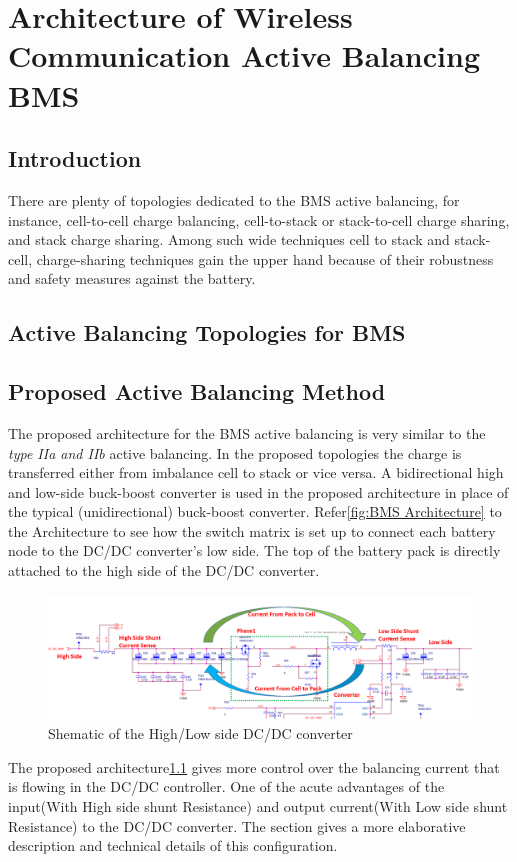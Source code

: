 \chapter{Architecture of Wireless Communication Active Balancing BMS}\label{ch:Architecture_Active_Balancing_BMS}
\section{Introduction}
There are plenty of topologies dedicated to the BMS active balancing, for instance, cell-to-cell charge balancing, cell-to-stack or stack-to-cell charge sharing, and stack charge sharing. Among such wide techniques cell to stack and stack-cell, charge-sharing techniques gain the upper hand because of their robustness and safety measures against the battery.
\section{Active Balancing Topologies for BMS }


\section{Proposed Active Balancing Method}
The proposed architecture for the BMS active balancing is very similar to the \textit{type IIa and IIb} active balancing. In the proposed topologies the charge is transferred either from imbalance cell to stack or vice versa.
A bidirectional high and low-side buck-boost converter is used in the proposed architecture in place of the typical (unidirectional) buck-boost converter. Refer\ref{fig:BMS Architecture} to the Architecture to see how the switch matrix is set up to connect each battery node to the DC/DC converter's low side. The top of the battery pack is directly attached to the high side of the DC/DC converter.
\begin{figure}[h]
	\centering
	\includegraphics[width=1\textwidth]{Chap04/Figures/Low_high_side_Converter_shematic.PNG}
	\caption{Shematic of the High/Low side DC/DC converter } 
	\label{fig:High_Low_DC_DC_Shematic}
\end{figure}
The proposed architecture\ref{fig:High_Low_DC_DC_Shematic} gives more control over the balancing current that is flowing in the DC/DC controller. One of the acute advantages of the input(With High side shunt Resistance) and output current(With Low side shunt Resistance) to the DC/DC converter. The section gives a more elaborative description and technical details of this configuration.
